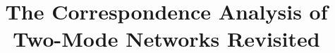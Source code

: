 \documentclass[a4paper,fleqn]{cas-sc}
\begin{document}
\let\WriteBookmarks\relax
\def\floatpagepagefraction{1}
\def\textpagefraction{.001}



\title [mode = title]{The Correspondence Analysis of Two-Mode Networks Revisited}                      




%








\end{document}

